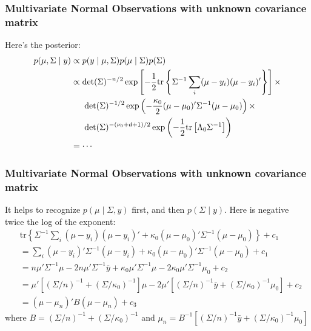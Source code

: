 \documentclass{beamer}
\begin{document}
\begin{frame}[fragile]
\frametitle{Multivariate Normal Observations with unknown covariance matrix}

Here's the posterior:
\begin{align*}
p(\mu, \Sigma \mid y) &\propto p(y \mid \mu, \Sigma)p(\mu \mid \Sigma)p(\Sigma) \\
&\propto \det(\Sigma)^{-n/2} \exp\left[-\frac{1}{2} \text{tr}\left\{\Sigma^{-1} \sum_i (\mu-y_i)(\mu-y_i)' \right\} \right] \times \\
& \hspace{5mm} \det(\Sigma)^{-1/2}\exp\left(-\frac{\kappa_0}{2}(\mu - \mu_0)'\Sigma^{-1}(\mu - \mu_0) \right)  \times \\
& \hspace{5mm}    \det(\Sigma)^{-(\nu_0 + d + 1)/2}\exp\left( -\frac{1}{2} \text{tr}\left[\Lambda_0 \Sigma^{-1} \right] \right) \\
&= \cdots
\end{align*}


\end{frame}

\begin{frame}[fragile]
\frametitle{Multivariate Normal Observations with unknown covariance matrix}
It helps to recognize $p(\mu \mid \Sigma, y)$ first, and then $p(\Sigma \mid y)$. Here is negative twice the log of the exponent:
\begin{align*}
&\text{tr}\left\{\Sigma^{-1} \sum_i (\mu-y_i)(\mu-y_i)'  + \kappa_0(\mu - \mu_0)'\Sigma^{-1}(\mu - \mu_0)  \right\} + c_1 \\
&=\sum_i (\mu-y_i)' \Sigma^{-1} (\mu-y_i)  + \kappa_0(\mu - \mu_0)'\Sigma^{-1}(\mu - \mu_0) + c_1 \\
&= n\mu ' \Sigma^{-1}\mu - 2  n\mu' \Sigma^{-1}\bar{y}  + \kappa_0\mu'\Sigma^{-1}\mu - 2  \kappa_0\mu' \Sigma^{-1}\mu_0  + c_2 \\
&= \mu ' \left[ (\Sigma/n)^{-1} + (\Sigma/\kappa_0)^{-1} \right] \mu - 2  \mu' \left[ (\Sigma/n)^{-1}\bar{y} +  (\Sigma/\kappa_0)^{-1}\mu_0 \right]    + c_2 \\
&= (\mu - \mu_n)'B(\mu - \mu_n) + c_3 
\end{align*}
where $B = (\Sigma/n)^{-1} + (\Sigma/\kappa_0)^{-1}$ and $\mu_n = B^{-1}\left[ (\Sigma/n)^{-1}\bar{y} +  (\Sigma/\kappa_0)^{-1}\mu_0 \right]$
\end{frame}
\end{document}
